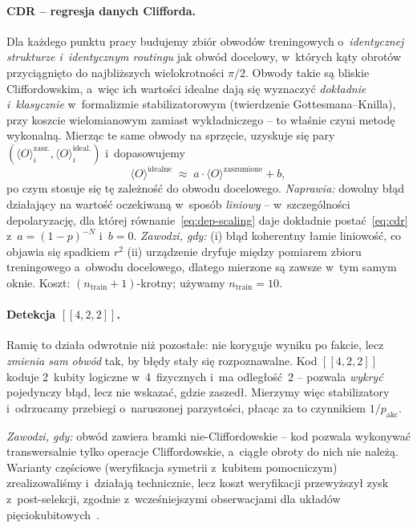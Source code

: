 \documentclass[11pt]{article}
\newcommand{\expv}{\langle O\rangle}
\begin{document}
\paragraph{CDR -- regresja danych Clifforda.} Dla każdego punktu pracy budujemy zbiór obwodów
treningowych o~\emph{identycznej strukturze i~identycznym routingu} jak obwód docelowy, w~których
kąty obrotów przyciągnięto do najbliższych wielokrotności $\pi/2$. Obwody takie są bliskie
Cliffordowskim, a~więc ich wartości idealne dają się wyznaczyć \emph{dokładnie i~klasycznie}
w~formalizmie stabilizatorowym (twierdzenie Gottesmana--Knilla), przy koszcie wielomianowym zamiast
wykładniczego -- to właśnie czyni metodę wykonalną. Mierząc te same obwody na sprzęcie, uzyskuje się
pary $(\expv^{\text{zasz.}}_i, \expv^{\text{ideal.}}_i)$ i~dopasowujemy
\begin{equation}
  \expv^{\text{idealne}} \;\approx\; a\cdot\expv^{\text{zaszumione}} + b ,
  \label{eq:cdr}
\end{equation}
po czym stosuje się tę zależność do obwodu docelowego. \emph{Naprawia:} dowolny błąd działający na
wartość oczekiwaną w~sposób \emph{liniowy} -- w~szczególności depolaryzację, dla której
równanie~\eqref{eq:dep-scaling} daje dokładnie postać~\eqref{eq:cdr} z~$a = (1-p)^{-N}$ i~$b=0$.
\emph{Zawodzi, gdy:} (i) błąd koherentny łamie liniowość, co objawia się spadkiem $r^2$ (ii) urządzenie dryfuje między pomiarem zbioru treningowego a~obwodu
docelowego, dlatego mierzone są zawsze w~tym samym oknie. Koszt: $(n_{\text{train}}+1)$-krotny;
używamy $n_{\text{train}}=10$.

\paragraph{Detekcja \texorpdfstring{$[[4,2,2]]$}{[[4,2,2]]}.} Ramię to działa odwrotnie niż
pozostałe: nie koryguje wyniku po fakcie, lecz \emph{zmienia sam obwód} tak, by błędy stały się
rozpoznawalne. Kod $[[4,2,2]]$ koduje 2~kubity logiczne w~4~fizycznych i~ma odległość~2 -- pozwala
\emph{wykryć} pojedynczy błąd, lecz nie wskazać, gdzie zaszedł. Mierzymy więc stabilizatory
i~odrzucamy przebiegi o~naruszonej parzystości, płacąc za to czynnikiem $1/p_{\text{akc}}$.

\emph{Zawodzi, gdy:} obwód zawiera bramki nie-Cliffordowskie -- kod pozwala wykonywać
transwersalnie tylko operacje Cliffordowskie, a~ciągłe obroty do nich nie należą. Warianty częściowe
(weryfikacja symetrii z~kubitem pomocniczym) zrealizowaliśmy i~działają technicznie, lecz koszt
weryfikacji przewyższył zysk z~post-selekcji, zgodnie z~wcześniejszymi obserwacjami dla układów
pięciokubitowych~\cite{vuillot2018,linke2017}. 
\end{document}
